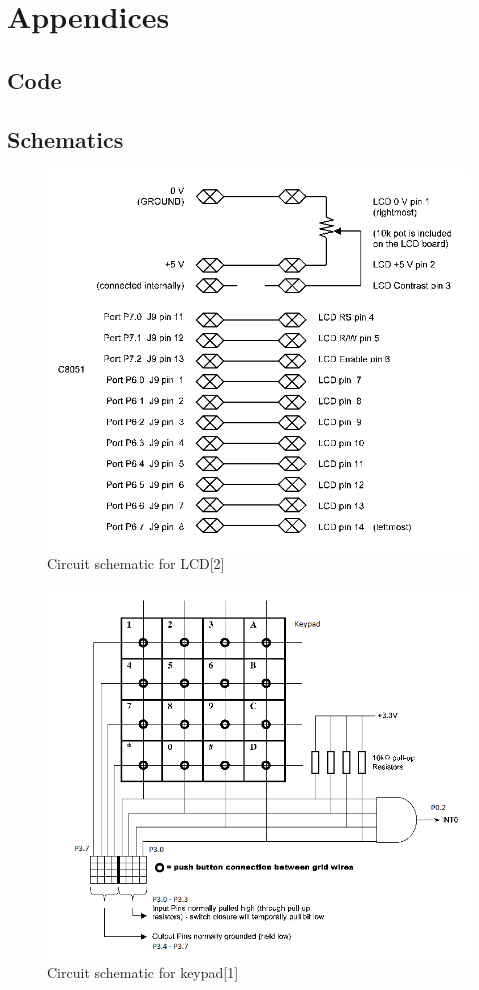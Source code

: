 \documentclass[12pt]{article}
\begin{document}
	
	\section{Appendices}
	\subsection{Code}
	
	\subsection{Schematics}
	\begin{figure}[H]
		\centering
		\includegraphics[width=\textwidth]{lcd_schematic.PNG}
		\caption[]{Circuit schematic for LCD[2]}
		\label{LCD}
	\end{figure}
	\begin{figure}[H]
		\centering
		\includegraphics[width=\textwidth]{keypad_schematic.png}
		\caption[]{Circuit schematic for keypad[1]}
		\label{KEY}
	\end{figure}
\end{document}
